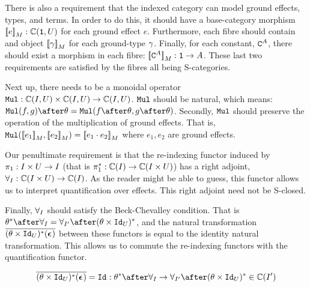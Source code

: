\documentclass{Report}
\begin{document}
There is also a requirement that the indexed category can model ground effects, types, and terms. In order to do this, it should have a base-category morphism ${\bf [\![}e{\bf ]\!]}_M: \mathbb{C}(\texttt{1}, U)$ for each ground effect $e$. Furthermore, each fibre should contain and object ${\bf [\![}\gamma{\bf ]\!]}_M$ for each ground-type $\gamma$. Finally, for each constant, $\texttt{C}^{A}$, there should exist a morphism in each fibre: ${\bf [\![}\texttt{C}^{A}{\bf ]\!]}_M: \texttt{1} \rightarrow A$. These last two requirements are satisfied by the fibres all being S-categories.

Next up, there needs to be a monoidal operator $\texttt{Mul}: \mathbb{C}(I, U) \times \mathbb{C}(I, U) \rightarrow \mathbb{C}(I, U)$. $\texttt{Mul}$ should be natural, which means: $\Mul(f, g)\after\theta = \Mul(f\after\theta, g\after\theta)$. Secondly, $\texttt{Mul}$ should preserve the operation of the multiplication of ground effects. That is, $\texttt{Mul}({\bf [\![}e_1{\bf ]\!]}_M,{\bf [\![}e_2{\bf ]\!]}_M) = {\bf [\![}e_1\cdot e_2{\bf ]\!]}_M$ where $e_1, e_2$ are ground effects.

Our penultimate requirement is that the re-indexing functor  induced by $\pi_1: I\times U\rightarrow I$ (that is $\pi_1^*: \mathbb{C}(I) \rightarrow \mathbb{C}(I\times U)$) has a right adjoint, $\forall_I: \mathbb{C}(I\times U) \rightarrow \mathbb{C}(I)$. As the reader might be able to guess, this functor allows us to interpret quantification over effects. This right adjoint need not be S-closed.

Finally, $\forall_I$ should satisfy the Beck-Chevalley condition. That is $\theta\star\after\allI = \allII\after(\theta\times\Id{U})\star$, and the natural transformation $\overline{(\theta\times\texttt{Id}_{U})^*(\boldsymbol{\epsilon}_{})}$ between these functors is equal to the identity natural transformation. This allows us to commute the re-indexing functors with the quantification functor.

\begin{align}
    \bar{(\theta\times\Id{U})\star(\counit{})} = \Id{}: \theta\star\after\allI \rightarrow \allII\after(\theta\times\Id{U})\star\in \C(I')
\end{align}
\end{document}
